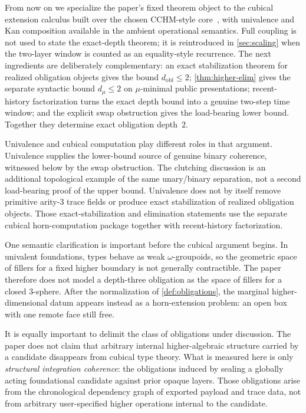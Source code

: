 \documentclass{lmcs}
\begin{document}
From now on we specialize the paper's fixed theorem object to the cubical extension calculus built over the chosen CCHM-style core~\cite{cubical,cchm-hits}, with univalence and Kan composition available in the ambient operational semantics. Full coupling is not used to state the exact-depth theorem; it is reintroduced in \autoref{sec:scaling} when the two-layer window is counted as an equality-style recurrence. The next ingredients are deliberately complementary: an exact stabilization theorem for realized obligation objects gives the bound $d_{\mathrm{obl}} \leq 2$; \autoref{thm:higher-elim} gives the separate syntactic bound $d_\mu \leq 2$ on $\mu$-minimal public presentations; recent-history factorization turns the exact depth bound into a genuine two-step time window; and the explicit swap obstruction gives the load-bearing lower bound. Together they determine exact obligation depth~$2$.

Univalence and cubical computation play different roles in that argument. Univalence supplies the lower-bound source of genuine binary coherence, witnessed below by the swap obstruction. The clutching discussion is an additional topological example of the same unary/binary separation, not a second load-bearing proof of the upper bound. Univalence does not by itself remove primitive arity-$3$ trace fields or produce exact stabilization of realized obligation objects. Those exact-stabilization and elimination statements use the separate cubical horn-computation package together with recent-history factorization.

One semantic clarification is important before the cubical argument begins. In univalent foundations, types behave as weak $\omega$-groupoids, so the geometric space of fillers for a fixed higher boundary is not generally contractible. The paper therefore does not model a depth-three obligation as the space of fillers for a closed $3$-sphere. After the normalization of \autoref{def:obligations}, the marginal higher-dimensional datum appears instead as a horn-extension problem: an open box with one remote face still free.

It is equally important to delimit the class of obligations under discussion. The paper does not claim that arbitrary internal higher-algebraic structure carried by a candidate disappears from cubical type theory. What is measured here is only \emph{structural integration coherence}: the obligations induced by sealing a globally acting foundational candidate against prior opaque layers. Those obligations arise from the chronological dependency graph of exported payload and trace data, not from arbitrary user-specified higher operations internal to the candidate.
\end{document}
